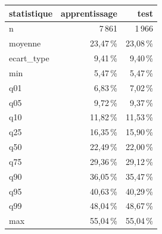 \begin{tabular}{lrr}
\toprule
\textbf{statistique} & \textbf{apprentissage} & \textbf{test} \\
\midrule
n & 7\,861 & 1\,966 \\
moyenne & 23,47\,\% & 23,08\,\% \\
ecart\_type & 9,41\,\% & 9,40\,\% \\
min & 5,47\,\% & 5,47\,\% \\
q01 & 6,83\,\% & 7,02\,\% \\
q05 & 9,72\,\% & 9,37\,\% \\
q10 & 11,82\,\% & 11,53\,\% \\
q25 & 16,35\,\% & 15,90\,\% \\
q50 & 22,49\,\% & 22,00\,\% \\
q75 & 29,36\,\% & 29,12\,\% \\
q90 & 36,05\,\% & 35,47\,\% \\
q95 & 40,63\,\% & 40,29\,\% \\
q99 & 48,04\,\% & 48,67\,\% \\
max & 55,04\,\% & 55,04\,\% \\
\bottomrule
\end{tabular}
